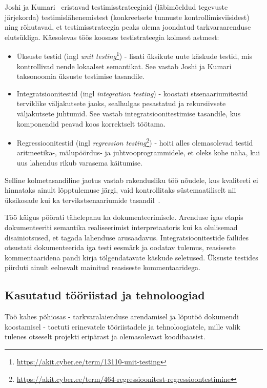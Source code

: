 Joshi ja Kumari~\cite{joshi_analyses_2022} eristavad testimisstrateegiaid (läbimõeldud tegevuste järjekorda) testimislähenemistest (konkreetsete tunnuste kontrollimisviisidest) ning rõhutavad, et testimisstrateegia peaks olema joondatud tarkvaraarenduse elutsükliga. Käesolevas töös koosnes testistrateegia kolmest astmest:

\begin{itemize}
	\item {Üksuste testid} (ingl \emph{unit testing}\footnote{\url{https://akit.cyber.ee/term/13110-unit-testing}}) - lisati üksikute uute käskude testid, mis kontrollivad nende lokaalset semantikat. See vastab Joshi ja Kumari taksonoomia üksuste testimise tasandile.
	\item {Integratsioonitestid} (ingl \emph{integration testing}) - koostati stsenaariumitestid terviklike väljakutsete jaoks, sealhulgas pesastatud ja rekursiivsete väljakutsete juhtumid. See vastab integratsioonitestimise tasandile, kus komponendid peavad koos korrektselt töötama.
	\item {Regressioonitestid} (ingl \emph{regression testing}\footnote{\url{https://akit.cyber.ee/term/464-regressioonitest-regressioontestimine}}) - hoiti alles olemasolevad testid aritmeetika-, mälupöördus- ja juhtvooprogrammidele, et oleks kohe näha, kui uus lahendus rikub varasema käitumise.
\end{itemize}

Selline kolmetasandiline jaotus vastab rakendusliku töö nõudele, kus kvaliteeti ei hinnataks ainult lõpptulemuse järgi, vaid kontrollitaks süstemaatiliselt nii üksikosade kui ka tervikstsenaariumide tasandil~\cite{joshi_analyses_2022}.

Töö käigus pöörati tähelepanu ka dokumenteerimisele. Arenduse igas etapis dokumenteeriti semantika realiseerimist interpretaatoris kui ka olulisemad disainiotsused, et tagada lahenduse arusaadavus. Integratsioonitestide failides otsustati dokumenteerida iga testi eesmärk ja oodatav tulemus, reasiseste kommentaaridena pandi kirja tõlgendatavate käskude seletused. Üksuste testides piirduti ainult eelnevalt mainitud reasiseste kommentaaridega.

\subsection{Kasutatud tööriistad ja tehnoloogiad}\label{implementatsioon:tooriistad}

Töö kahes põhiosas - tarkvaralaienduse arendamisel ja lõputöö dokumendi koostamisel - toetuti erinevatele tööriistadele ja tehnoloogiatele, mille valik tulenes otseselt projekti eripärast ja olemasolevast koodibaasist.


